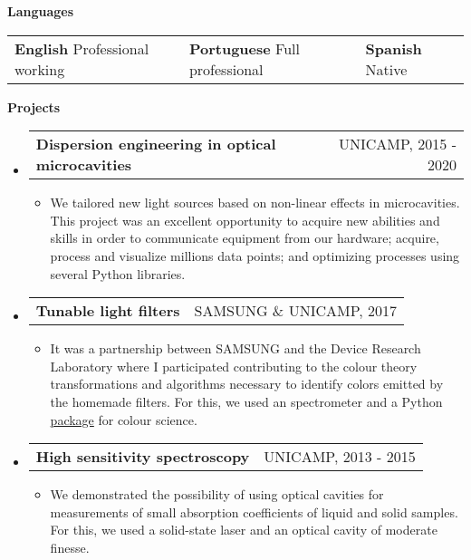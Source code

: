 \documentclass[letterpaper,12pt]{article}[leftmargin=*]
\makeatletter
\def \entryspacing {-0pt}
\renewcommand{\section}[2]{\vspace{5pt}
  \colorbox{secondary}{\color{white}\raggedbottom\normalsize\textbf{{#1}{\hspace{7pt}#2}}}
}
\newcommand{\resumeEntryStart}{\begin{itemize}[leftmargin=2.5mm]}
\newcommand{\resumeEntryEnd}{\end{itemize}\vspace{\entryspacing}}
\newcommand{\resumeItemListStart}{\begin{itemize}[leftmargin=4.5mm]}
\newcommand{\resumeItemListEnd}{\end{itemize}}
\newcommand{\resumeItem}[1]{
  \item\small{
    {#1 \vspace{-2pt}}
  }
}
\newcommand{\resumeEntryTD}[2]{
  \vspace{-1pt}\item[]
    \begin{tabularx}{0.97\textwidth}{X@{\hspace{60pt}}r}
      \textbf{\color{primary}#1} & {\firabook\color{accent}\small#2} \\
    \end{tabularx}\vspace{-6pt}
}
\newcommand{\resumeEntryS}[2]{
  \item[]\small{
    \textbf{\color{primary}#1 }{ #2 \vspace{-6pt}}
  }
}
\newcommand{\triplecol}[3]{
	\begin{tabularx}{\textwidth}{XXX}
	{\small#1} & {\small#2} & {\small#3}\\
	\end{tabularx}
}
\makeatother
\begin{document}
\section{\faComment}{Languages}
\vspace{-0.5cm}
\resumeEntryStart
	\triplecol{\resumeEntryS{English} {Professional working}}{\resumeEntryS{Portuguese}{Full professional}}{\resumeEntryS{Spanish}{Native}}
\resumeEntryEnd
\vspace{-0.1cm}

\section{\faFlask}{Projects}
\vspace{-0.1cm}

\resumeEntryStart
\resumeEntryTD
{Dispersion engineering in optical microcavities}{UNICAMP, 2015 - 2020}
\resumeItemListStart
\resumeItem{We tailored new light sources based on non-linear effects in microcavities. This project was an excellent opportunity to acquire new abilities and skills in order to communicate equipment from our hardware; acquire, process and visualize millions data points; and optimizing processes using several Python libraries.}
\resumeItemListEnd
\resumeEntryEnd

\vspace{-0.5cm}

\resumeEntryStart
\resumeEntryTD
{Tunable light filters}{SAMSUNG \& UNICAMP, 2017}
\resumeItemListStart
\resumeItem {It was a partnership between SAMSUNG and the Device Research Laboratory where I participated contributing to the colour theory transformations and algorithms necessary to identify colors emitted by the homemade filters. For this, we used an spectrometer and a Python \href{https://www.colour-science.org/}{package} for colour science.}
\resumeItemListEnd
\resumeEntryEnd

\vspace{-0.5cm}

\resumeEntryStart
\resumeEntryTD
{High sensitivity spectroscopy}{UNICAMP, 2013 - 2015}
\resumeItemListStart
\resumeItem{We demonstrated the possibility of using optical cavities for measurements of small absorption coefficients of liquid and solid samples. For this, we used a solid-state laser and an optical cavity of moderate finesse.}
\resumeItemListEnd
\resumeEntryEnd
\end{document}

